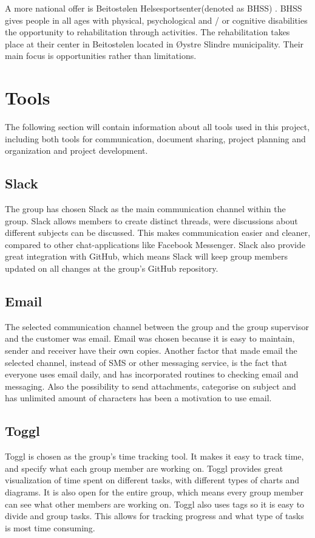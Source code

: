 A more national offer is Beitostølen Helsesportsenter(denoted as BHSS) \cite{BHSS}. BHSS gives people in all ages with physical, psychological and / or cognitive disabilities the opportunity to rehabilitation through activities. The rehabilitation takes place at their center in Beitostølen located in Øystre Slindre municipality. Their main focus is opportunities rather than limitations.  

\section{Tools}
The following section will contain information about all tools used in this project, including both tools for communication, document sharing, project planning and organization and project development.

\subsection{Slack}
The group has chosen Slack \cite{Slack} as the main communication channel within the group. Slack allows members to create distinct threads, were discussions about different subjects can be discussed. This makes communication easier and cleaner, compared to other chat-applications like Facebook Messenger. Slack also provide great integration with GitHub, which means Slack will keep group members updated on all changes at the group's GitHub repository. 

\subsection{Email}
The selected communication channel between the group and the group supervisor and the customer was email.
Email was chosen because it is easy to maintain, sender and receiver have their own copies. Another factor that made email the selected channel, instead of SMS or other messaging service, is the fact that everyone uses email daily, and has incorporated routines to checking email and messaging. Also the possibility to send attachments, categorise on subject and has unlimited amount of characters has been a motivation to use email.  

\subsection{Toggl}
Toggl \cite{Toggl} is chosen as the group's time tracking tool. It makes it easy to track time, and specify what each group member are working on. Toggl provides great visualization of time spent on different tasks, with different types of charts and diagrams. It is also open for the entire group, which means every group member can see what other members are working on. Toggl also uses tags so it is easy to divide and group tasks. This allows for tracking progress and what type of tasks is most time consuming.



